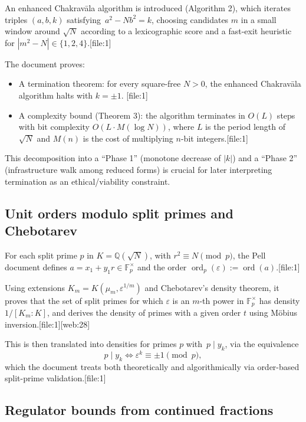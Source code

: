 \documentclass[11pt]{article}
\begin{document}
An enhanced Chakrav\=ala algorithm is introduced (Algorithm 2), which
iterates triples \((a,b,k)\) satisfying
\(\,a^2 - N b^2 = k\), choosing candidates \(m\) in a small window around
\(\sqrt{N}\) according to a lexicographic score and a fast-exit heuristic
for \(|m^2 - N|\in\{1,2,4\}\).[file:1]

The document proves:

\begin{itemize}
  \item A termination theorem: for every square-free \(N > 0\), the
        enhanced Chakrav\=ala algorithm halts with \(k = \pm 1\).%
        [file:1]
  \item A complexity bound (Theorem 3): the algorithm terminates in
        \(O(L)\) steps with bit complexity \(O(L \cdot M(\log N))\), where
        \(L\) is the period length of \(\sqrt{N}\) and \(M(n)\) is the cost
        of multiplying \(n\)-bit integers.[file:1]
\end{itemize}

This decomposition into a ``Phase 1'' (monotone decrease of \(|k|\))
and a ``Phase 2'' (infrastructure walk among reduced forms) is crucial
for later interpreting termination as an ethical/viability constraint.

\subsection{Unit orders modulo split primes and Chebotarev}

For each split prime \(p\) in \(K = \mathbb{Q}(\sqrt{N})\), with
\(r^2 \equiv N \pmod p\), the Pell document defines
\(a = x_1 + y_1 r \in \mathbb{F}_p^\times\) and the order
\(\operatorname{ord}_p(\varepsilon) := \operatorname{ord}(a)\).[file:1]

Using extensions \(K_m = K(\mu_m, \varepsilon^{1/m})\) and Chebotarev's
density theorem, it proves that the set of split primes for which
\(\varepsilon\) is an \(m\)-th power in \(\mathbb{F}_p^\times\) has
density \(1/[K_m : K]\), and derives the density of primes with a given
order \(t\) using M\"obius inversion.[file:1][web:28]

This is then translated into densities for primes \(p\) with
\(\,p \mid y_k\), via the equivalence
\[
p\mid y_k \iff \varepsilon^k \equiv \pm 1 \pmod p,
\]
which the document treats both theoretically and algorithmically via
order-based split-prime validation.[file:1]

\subsection{Regulator bounds from continued fractions}
\end{document}
